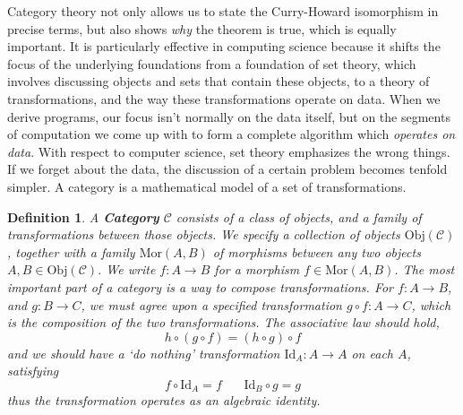 \documentclass{article}
\theoremstyle{plain}
\newtheorem{definition}{Definition}
\begin{document}
Category theory not only allows us to state the Curry-Howard isomorphism in precise terms, but also shows {\it why} the theorem is true, which is equally important. It is particularly effective in computing science because it shifts the focus of the underlying foundations from a foundation of set theory, which involves discussing objects and sets that contain these objects, to a theory of transformations, and the way these transformations operate on data. When we derive programs, our focus isn't normally on the data itself, but on the segments of computation we come up with to form a complete algorithm which {\it operates on data}. With respect to computer science, set theory emphasizes the wrong things. If we forget about the data, the discussion of a certain problem becomes tenfold simpler. A category is a mathematical model of a set of transformations.

\begin{definition}
    A {\bf Category} $\mathcal{C}$ consists of a class of objects, and a family of transformations between those objects. We specify a collection of objects $\text{Obj}(\mathcal{C})$, together with a family $\text{Mor}(A,B)$ of {\it morphisms} between any two objects $A,B \in \text{Obj}(\mathcal{C})$. We write $f: A \to B$ for a morphism $f \in \text{Mor}(A,B)$. The most important part of a category is a way to compose transformations. For $f: A \to B$, and $g: B \to C$, we must agree upon a specified transformation $g \circ f: A \to C$, which is the composition of the two transformations. The associative law should hold,
    \[ h \circ (g \circ f) = (h \circ g) \circ f \]
    and we should have a `do nothing' transformation $\text{Id}_A: A \to A$ on each $A$, satisfying
    \[ f \circ \text{Id}_A = f\ \ \ \ \ \ \ \ \text{Id}_B \circ g = g \]
    thus the transformation operates as an algebraic identity.
\end{definition}
\end{document}

